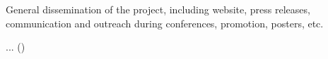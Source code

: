 \begin{task}[
  title=Dissemination and communication activities,
  id=website,
  lead=INSERM,
  PM=12,
  wphases={0-48},
  partners={SRL,XFEL,QS,WTT,SIL,INSERM,UPSUD}
]
  General dissemination of the project,
  including website, press releases, communication and outreach 
  during conferences, promotion, posters, etc. 

  \begin{compactitem}
  \item ...
    ()
  \end{compactitem}
\end{task}
